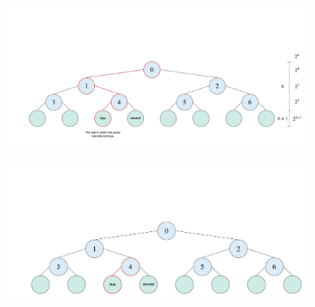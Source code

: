 






\begin{figure}[H]
\centering
\includegraphics[width=0.9\textwidth]{pics/kd-tree-visual/22.png}
\caption{}
\end{figure}

\begin{figure}[H]
\centering
\includegraphics[width=0.9\textwidth]{pics/kd-tree-visual/3.png}
\caption{}
\end{figure}

